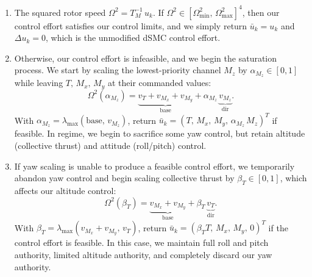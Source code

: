 \documentclass[conf]{new-aiaa}
\begin{document}
\begin{enumerate}
\item The squared rotor speed $\Omega^2 = T_M^{-1}\, u_k$. If $\Omega^2 \in [\Omega^2_{\min},\, \Omega^2_{\max}]^4$, then our control effort satisfies our control limits, and we simply return $\bar u_k = u_k$ and $\Delta u_k = 0$, which is the unmodified dSMC control effort.

\item Otherwise, our control effort is infeasible, and we begin the saturation process. We start by scaling the lowest-priority channel $M_z$ by $\alpha_{M_z} \in [0, 1]$ while leaving $T,\, M_x,\, M_y$ at their commanded values:
\small
\begin{equation}
\label{eq:sat-stage1}
\Omega^2(\alpha_{M_z}) = \underbrace{v_T + v_{M_x} + v_{M_y}}_{\text{base}} + \alpha_{M_z}\, \underbrace{v_{M_z}}_{\text{dir}}.
\end{equation}
\normalsize
With $\alpha_{M_z} = \lambda_{\max}(\text{base},\, v_{M_z})$, return $\bar u_k = (T,\, M_x,\, M_y,\, \alpha_{M_z}\, M_z)^T$ if feasible. In regime, we begin to sacrifice some yaw control, but retain altitude (collective thrust) and attitude (roll/pitch) control.

\item If yaw scaling is unable to produce a feasible control effort, we temporarily abandon yaw control and begin scaling collective thrust by $\beta_T \in [0, 1]$, which affects our altitude control:
\small
\begin{equation}
\label{eq:sat-stage2}
\Omega^2(\beta_T) = \underbrace{v_{M_x} + v_{M_y}}_{\text{base}} + \beta_T\, \underbrace{v_T}_{\text{dir}}.
\end{equation}
\normalsize
With $\beta_T = \lambda_{\max}(v_{M_x} + v_{M_y},\, v_T)$, return $\bar u_k = (\beta_T T,\, M_x,\, M_y,\, 0)^T$ if the control effort is feasible. In this case, we maintain full roll and pitch authority, limited altitude authority, and completely discard our yaw authority. 


\end{enumerate}
\end{document}
